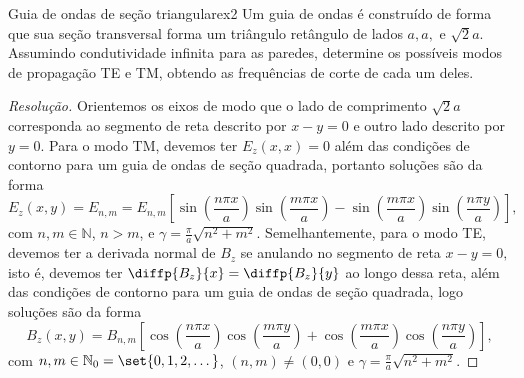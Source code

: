 \begin{exercício}{Guia de ondas de seção triangular}{ex2}
    Um guia de ondas é construído de forma que sua seção transversal forma um triângulo retângulo de lados \(a, a,\) e \(\sqrt{2}a\). Assumindo condutividade infinita para as paredes, determine os possíveis modos de propagação TE e TM, obtendo as frequências de corte de cada um deles.
\end{exercício}
\begin{proof}[Resolução]
    Orientemos os eixos de modo que o lado de comprimento \(\sqrt{2}a\) corresponda ao segmento de reta descrito por \(x - y = 0\) e outro lado descrito por \(y = 0\). Para o modo TM, devemos ter \(E_z(x,x) = 0\) além das condições de contorno para um guia de ondas de seção quadrada, portanto soluções são da forma
    \begin{equation*}
        E_z(x,y) = E_{n,m} = E_{n, m} \left[\sin\left(\frac{n \pi x}{a}\right) \sin\left(\frac{m \pi x}{a}\right) - \sin\left(\frac{m \pi x}{a}\right)\sin\left(\frac{n \pi y}{a}\right)\right],
    \end{equation*}
    com \(n, m \in \mathbb{N}\), \(n > m\), e \(\gamma = \frac{\pi}{a}\sqrt{n^2 + m^2}.\)
    Semelhantemente, para o modo TE, devemos ter a derivada normal de \(B_z\) se anulando no segmento de reta \(x - y = 0,\) isto é, devemos ter \(\diffp{B_z}{x} = \diffp{B_z}{y}\) ao longo dessa reta, além das condições de contorno para um guia de ondas de seção quadrada, logo soluções são da forma
    \begin{equation*}
        B_z(x,y) = B_{n,m} \left[\cos\left(\frac{n \pi x}{a}\right)\cos\left(\frac{m \pi y}{a}\right) + \cos\left(\frac{m \pi x}{a}\right)\cos\left(\frac{n \pi y}{a}\right)\right],
    \end{equation*}
    com \(n,m \in \mathbb{N}_0 = \set{0,1,2,\dots}\), \((n,m) \neq (0,0)\) e \(\gamma = \frac{\pi}{a} \sqrt{n^2 + m^2}\).


\end{proof}
